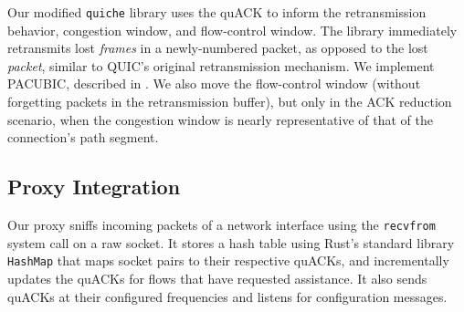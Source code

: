 Our modified \texttt{quiche} library uses the quACK to inform the
retransmission behavior, congestion window, and flow-control window. The library
immediately retransmits lost \emph{frames} in a newly-numbered
packet, as opposed to the lost \emph{packet}, similar to QUIC's original
retransmission mechanism. We implement PACUBIC,
described in .
We also move the flow-control window (without forgetting packets in the
retransmission buffer), but only in the ACK reduction scenario, when the
congestion window is nearly representative of that of the \sys connection's
path segment.



\subsection{Proxy Integration}
\label{sec:implementation:proxy}

Our proxy sniffs incoming packets of a network interface using the
\texttt{recvfrom} system call on a raw socket.
It stores a hash table using Rust's standard library \texttt{HashMap} that maps
socket pairs to their respective quACKs, and
incrementally updates the quACKs for flows that have requested \sys assistance.
It also sends quACKs at their configured frequencies and listens for
configuration messages.

